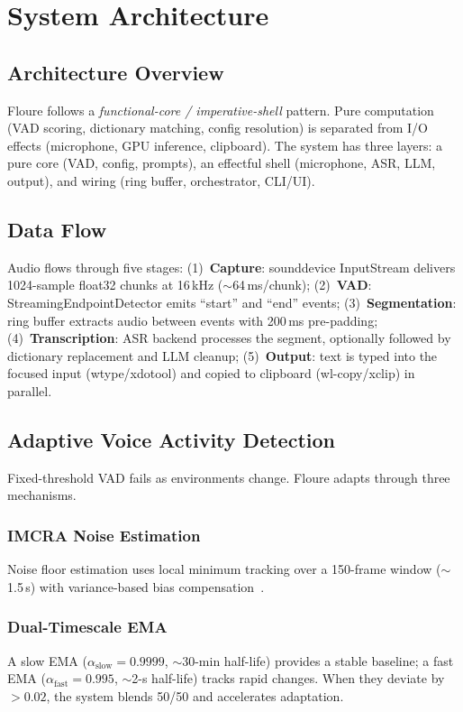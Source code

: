 \documentclass[11pt]{article}
\begin{document}
\section{System Architecture}

\subsection{Architecture Overview}

Floure follows a \emph{functional-core / imperative-shell} pattern. Pure computation
(VAD scoring, dictionary matching, config resolution) is separated from I/O effects
(microphone, GPU inference, clipboard). The system has three layers: a pure core (VAD,
config, prompts), an effectful shell (microphone, ASR, LLM, output), and wiring
(ring buffer, orchestrator, CLI/UI).

\subsection{Data Flow}

Audio flows through five stages:
(1)~\textbf{Capture}: sounddevice InputStream delivers 1024-sample float32 chunks at 16\,kHz
($\sim$64\,ms/chunk);
(2)~\textbf{VAD}: StreamingEndpointDetector emits ``start'' and ``end'' events;
(3)~\textbf{Segmentation}: ring buffer extracts audio between events with 200\,ms pre-padding;
(4)~\textbf{Transcription}: ASR backend processes the segment, optionally followed by
dictionary replacement and LLM cleanup;
(5)~\textbf{Output}: text is typed into the focused input (wtype/xdotool) and copied to
clipboard (wl-copy/xclip) in parallel.

\subsection{Adaptive Voice Activity Detection}

Fixed-threshold VAD fails as environments change. Floure adapts through three mechanisms.

\subsubsection{IMCRA Noise Estimation}
Noise floor estimation uses local minimum tracking over a 150-frame window ($\sim$1.5\,s)
with variance-based bias compensation~\cite{cohen2003imcra}.

\subsubsection{Dual-Timescale EMA}
A slow EMA ($\alpha_{\text{slow}} = 0.9999$, $\sim$30-min half-life) provides a stable
baseline; a fast EMA ($\alpha_{\text{fast}} = 0.995$, $\sim$2-s half-life) tracks rapid
changes. When they deviate by $>0.02$, the system blends 50/50 and accelerates adaptation.
\end{document}
